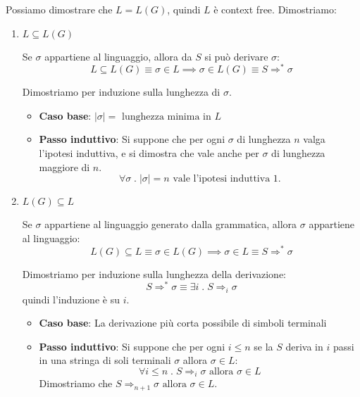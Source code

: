 \documentclass[a4paper]{article}
\begin{document}
\begin{definition}
  Possiamo dimostrare che \( L = L(G) \), quindi \( L \) è context free. Dimostriamo:
  \begin{enumerate}
    \item \( L \subseteq L(G) \)

      \vspace{1em}
      \noindent
      Se \( \sigma  \) appartiene al linguaggio, allora da \( S \) si può derivare \( \sigma \):
      \[
        L \subseteq L(G) \equiv \sigma \in L \implies \sigma \in L(G) \equiv S \Rightarrow^* \sigma
      \] 

      \vspace{1em}
      \noindent
      Dimostriamo per induzione sulla lunghezza di \( \sigma  \).
      \begin{itemize}
        \item \textbf{Caso base}: \( |\sigma| = \text{ lunghezza minima in } L \)
        \item \textbf{Passo induttivo}: Si suppone che per ogni \( \sigma  \) di lunghezza
          \( n \) valga l'ipotesi induttiva, e si dimostra che vale anche per
          \( \sigma  \) di lunghezza maggiore di \( n \).
          \[
            \forall \sigma  \;.\; |\sigma| = n \text{ vale l'ipotesi induttiva 1.}
          \] 
      \end{itemize}
    \item \( L(G) \subseteq L \) 

      \vspace{1em}
      \noindent
      Se \( \sigma \) appartiene al linguaggio generato dalla grammatica, allora \( \sigma \)
      appartiene al linguaggio:
      \[
        L(G) \subseteq L \equiv \sigma \in L(G) \implies \sigma \in L \equiv S \Rightarrow^* \sigma
      \] 

      \vspace{1em}
      \noindent
      Dimostriamo per induzione sulla lunghezza della derivazione:
      \[
        S \Rightarrow^* \sigma \equiv \exists i \;.\; S \Rightarrow_i \sigma
      \] 
      quindi l'induzione è su \( i \).
      \begin{itemize}
        \item \textbf{Caso base}: La derivazione più corta possibile di simboli terminali
        \item \textbf{Passo induttivo}: Si suppone che per ogni \( i \le n \) se
          la \( S \) deriva in \( i \) passi in una stringa di soli terminali \( \sigma  \) 
          allora \( \sigma  \in L \):
          \[
            \forall i \le n \;.\; S \Rightarrow_i \sigma \text{ allora } \sigma \in L
          \] 
          Dimostriamo che \( S \Rightarrow_{n+1} \sigma \text{ allora } \sigma \in L \).
      \end{itemize}
  \end{enumerate}
\end{definition}
\end{document}
